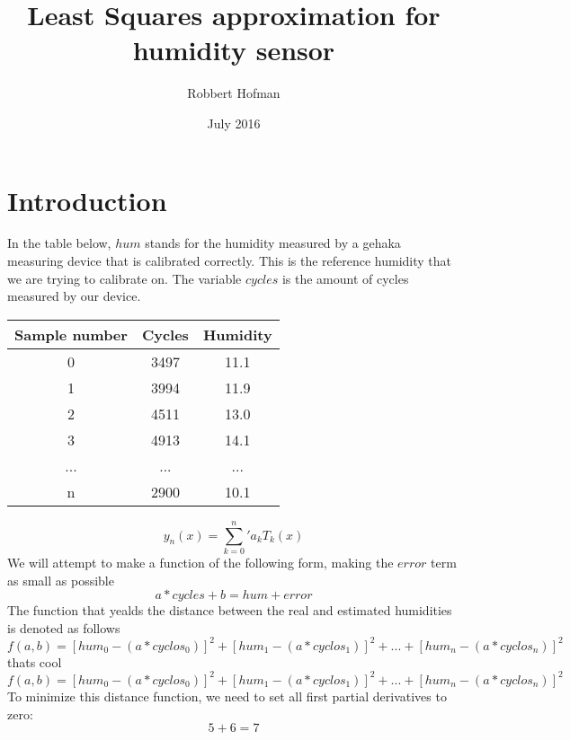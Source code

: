 \documentclass{article}
\title{Least Squares approximation for humidity sensor}
\author{Robbert Hofman}
\date{July 2016}
\begin{document}
\maketitle

\section{Introduction}
In the table below, $hum$ stands for the humidity measured by a gehaka measuring device that is calibrated correctly. 
This is the reference humidity that we are trying to calibrate on. 
The variable $cycles$ is the amount of cycles measured by our device.

\begin{center}
\begin{tabular}{ c c c }
\hline
 Sample number & Cycles & Humidity \\ 
\hline
 0 & 3497 & 11.1  \\  
 1 & 3994 & 11.9 \\
 2 & 4511 & 13.0 \\
 3 & 4913 & 14.1 \\ 
 ... & ... & ... \\ 
 n & 2900 & 10.1
\end{tabular}
\end{center}

\begin{equation}
y_n(x) = \sum_{k=0}^n {'} a_k T_k(x)
\end{equation}
We will attempt to make a function of the following form, making the $error$ term as small as possible
\begin{equation}
a*cycles + b = hum + error
\end{equation}
The function that yealds the distance between the real and estimated humidities is denoted as follows
\begin{equation}
f(a,b) = [hum_{0} - (a*cyclos_{0})]^{2} + [hum_{1} - (a*cyclos_{1})]^{2}
	 + ... +  [hum_{n} - (a*cyclos_{n})]^{2}
\end{equation}
thats cool
$$f(a,b) = [hum_{0} - (a*cyclos_{0})]^{2} + [hum_{1} - (a*cyclos_{1})]^{2} + ... +  [hum_{n} - (a*cyclos_{n})]^{2}$$
To minimize this distance function, we need to set all first partial derivatives to zero:
\begin{equation}
\end{equation}
\begin{equation}
5 + 6 = 7 
\end{equation}
\end{document}
